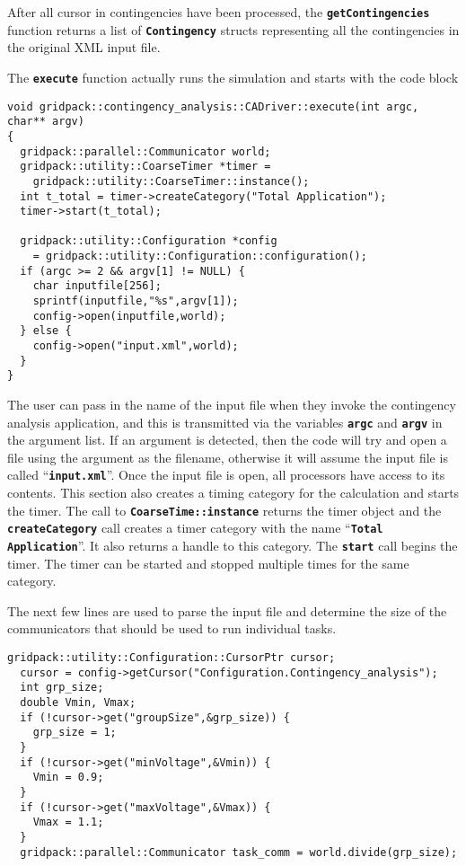 After all cursor in contingencies have been processed, the \texttt{\textbf{getContingencies}} function returns a list of \texttt{\textbf{Contingency}} structs representing all the contingencies in the original XML input file.

The \texttt{\textbf{execute}} function actually runs the simulation and starts with the code block

{
\color{red}
\begin{Verbatim}[fontseries=b]
void gridpack::contingency_analysis::CADriver::execute(int argc, char** argv)
{
  gridpack::parallel::Communicator world;
  gridpack::utility::CoarseTimer *timer =
    gridpack::utility::CoarseTimer::instance();
  int t_total = timer->createCategory("Total Application");
  timer->start(t_total);

  gridpack::utility::Configuration *config
    = gridpack::utility::Configuration::configuration();
  if (argc >= 2 && argv[1] != NULL) {
    char inputfile[256];
    sprintf(inputfile,"%s",argv[1]);
    config->open(inputfile,world);
  } else {
    config->open("input.xml",world);
  }
}
\end{Verbatim}
}

The user can pass in the name of the input file when they invoke the contingency analysis application, and this is transmitted via the variables \texttt{\textbf{argc}} and \texttt{\textbf{argv}} in the argument list. If an argument is detected, then the code will try and open a file using the argument as the filename, otherwise it will assume the input file is called ``\texttt{\textbf{input.xml}}''. Once the input file is open, all processors have access to its contents. This section also creates a timing category for the calculation and starts the timer. The call to \texttt{\textbf{CoarseTime::instance}} returns the timer object and the \texttt{\textbf{createCategory}} call creates a timer category with the name ``\texttt{\textbf{Total Application}}''. It also returns a handle to this category. The \texttt{\textbf{start}} call begins the timer. The timer can be started and stopped multiple times for the same category.

The next few lines are used to parse the input file and determine the size of the communicators that should be used to run individual tasks.

{
\color{red}
\begin{Verbatim}[fontseries=b]
  gridpack::utility::Configuration::CursorPtr cursor;
  cursor = config->getCursor("Configuration.Contingency_analysis");
  int grp_size;
  double Vmin, Vmax;
  if (!cursor->get("groupSize",&grp_size)) {
    grp_size = 1;
  }
  if (!cursor->get("minVoltage",&Vmin)) {
    Vmin = 0.9;
  }
  if (!cursor->get("maxVoltage",&Vmax)) {
    Vmax = 1.1;
  }
  gridpack::parallel::Communicator task_comm = world.divide(grp_size);
\end{Verbatim}
}

